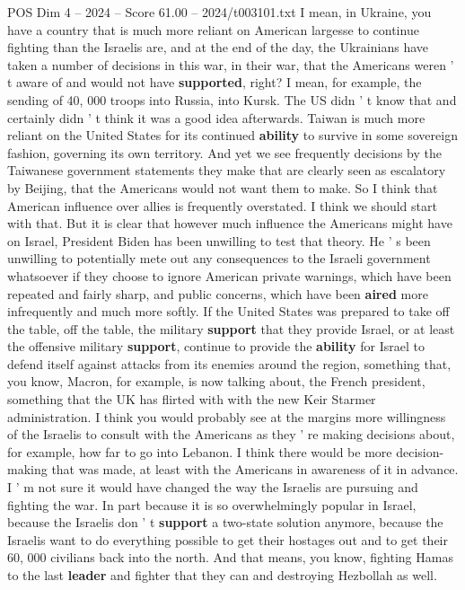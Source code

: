\begin{textsample}{POS Dim 4 – 2024 – Score 61.00 – 2024/t003101.txt}
I mean, in Ukraine, you have a country that is much more reliant on American largesse to continue fighting than the Israelis are, and at the end of the day, the Ukrainians have taken a number of decisions in this war, in their war, that the Americans weren ' t aware of and would not have \textbf{supported}, right?
I mean, for example, the sending of 40, 000 troops into Russia, into Kursk.
The US didn ' t know that and certainly didn ' t think it was a good idea afterwards.
Taiwan is much more reliant on the United States for its continued \textbf{ability} to survive in some sovereign fashion, governing its own territory.
And yet we see frequently decisions by the Taiwanese government statements they make that are clearly seen as escalatory by Beijing, that the Americans would not want them to make.
So I think that American influence over allies is frequently overstated.
I think we should start with that.
But it is clear that however much influence the Americans might have on Israel, President Biden has been unwilling to test that theory.
He ' s been unwilling to potentially mete out any consequences to the Israeli government whatsoever if they choose to ignore American private warnings, which have been repeated and fairly sharp, and public concerns, which have been \textbf{aired} more infrequently and much more softly.
If the United States was prepared to take off the table, off the table, the military \textbf{support} that they provide Israel, or at least the offensive military \textbf{support}, continue to provide the \textbf{ability} for Israel to defend itself against attacks from its enemies around the region, something that, you know, Macron, for example, is now talking about, the French president, something that the UK has flirted with with the new Keir Starmer administration.
I think you would probably see at the margins more willingness of the Israelis to consult with the Americans as they ' re making decisions about, for example, how far to go into Lebanon.
I think there would be more decision-making that was made, at least with the Americans in awareness of it in advance.
I ' m not sure it would have changed the way the Israelis are pursuing and fighting the war.
In part because it is so overwhelmingly popular in Israel, because the Israelis don ' t \textbf{support} a two-state solution anymore, because the Israelis want to do everything possible to get their hostages out and to get their 60, 000 civilians back into the north.
And that means, you know, fighting Hamas to the last \textbf{leader} and fighter that they can and destroying Hezbollah as well.

\end{textsample}
